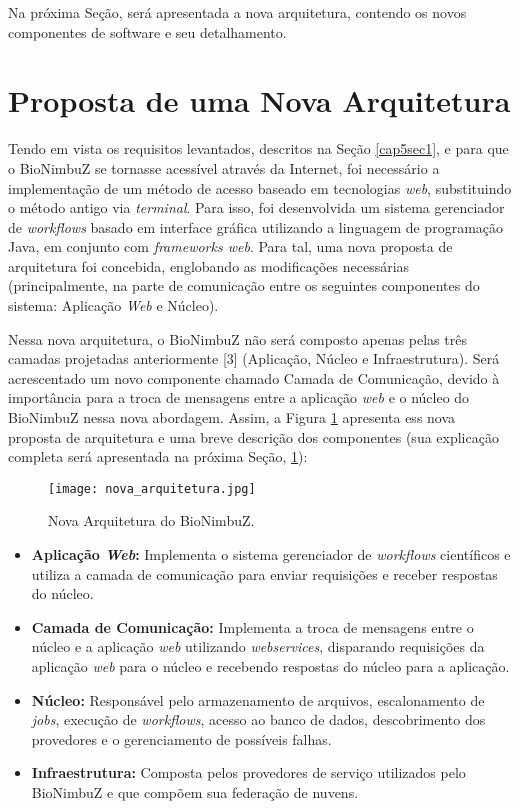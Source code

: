 Na próxima Seção, será apresentada a nova arquitetura, contendo os novos componentes de software e seu detalhamento.

\section{Proposta de uma Nova Arquitetura} \label{cap5sec3}

Tendo em vista os requisitos levantados, descritos na Seção \ref{cap5sec1}, e para que o BioNimbuZ se tornasse acessível através da Internet, foi necessário a implementação de um método de acesso baseado em tecnologias \textit{web}, substituindo o método antigo via \textit{terminal}. Para isso, foi desenvolvida um sistema gerenciador de \textit{workflows} basado em interface gráfica utilizando a linguagem de programação Java, em conjunto com \textit{frameworks web}. Para tal, uma nova proposta de arquitetura foi concebida, englobando as modificações necessárias (principalmente, na parte de comunicação entre os seguintes componentes do sistema: Aplicação \textit{Web} e Núcleo). 

Nessa nova arquitetura, o BioNimbuZ não será composto apenas pelas três camadas projetadas anteriormente [3] (Aplicação, Núcleo e Infraestrutura). Será acrescentado um novo componente chamado Camada de Comunicação, devido à importância para a troca de mensagens entre a aplicação \textit{web} e o núcleo do BioNimbuZ nessa nova abordagem. Assim, a Figura \ref{fig:proposta_arquitetura} apresenta ess nova proposta de arquitetura e uma breve descrição dos componentes (sua explicação completa será apresentada na próxima Seção, \ref{cap5sec3}): 

\begin{figure}[H]
	\centering
	\texttt{[image: nova\_arquitetura.jpg]}
	\caption{Nova Arquitetura do BioNimbuZ.}
	\label{fig:proposta_arquitetura}
\end{figure}

\begin{itemize}
	\item \textbf{Aplicação \textit{Web}:} Implementa o sistema gerenciador de \textit{workflows} científicos e utiliza a camada de comunicação para enviar requisições e receber respostas do núcleo.
    \item \textbf{Camada de Comunicação:} Implementa a troca de mensagens entre o núcleo e a aplicação \textit{web} utilizando \textit{webservices}, disparando requisições da aplicação \textit{web} para o núcleo e recebendo respostas do núcleo para a aplicação.
    \item \textbf{Núcleo:} Responsável pelo armazenamento de arquivos, escalonamento de \textit{jobs}, execução de \textit{workflows}, acesso ao banco de dados, descobrimento dos provedores e o gerenciamento de possíveis falhas.

\item \textbf{Infraestrutura:} Composta pelos provedores de serviço utilizados pelo BioNimbuZ e que compõem sua federação de nuvens.
\end{itemize}

